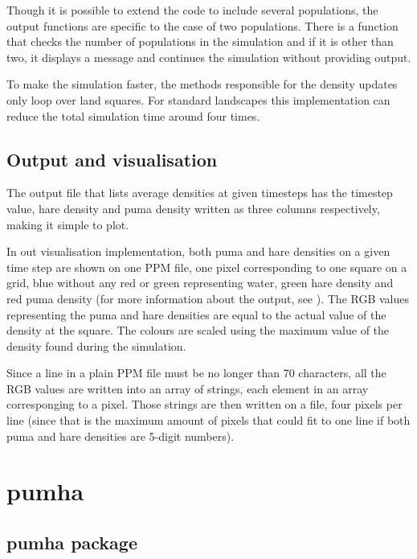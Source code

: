\documentclass[letterpaper,10pt,english]{sphinxmanual}
\begin{document}
Though it is possible to extend the code to include several populations, the output functions are specific to the case of two populations. There is a function that checks the number of populations in the simulation and if it is other than two, it displays a message and continues the simulation without providing output.

To make the simulation faster, the methods responsible for the density updates only loop over land squares. For standard landscapes this implementation can reduce the total simulation time around four times.


\section{Output and visualisation}
\label{\detokenize{index:output-and-visualisation}}
The output file that lists average densities at given timesteps has the timestep value, hare density and puma density written as three columns respectively, making it simple to plot.

In out visualisation implementation, both puma and hare densities on a given time step are shown on one PPM file, one pixel corresponding to one square on a grid, blue without any red or green representing water, green hare density and red puma density (for more information about the output, see {\hyperref[\detokenize{index:how-to-use}]{}}). The RGB values representing the puma and hare densities are equal to the actual value of the density at the square. The colours are scaled using the maximum value of the density found during the simulation.

Since a line in a plain PPM file must be no longer than 70 characters, all the RGB values are written into an array of strings, each element in an array corresponging to a pixel. Those strings are then written on a file, four pixels per line (since that is the maximum amount of pixels that could fit to one line if both puma and hare densities are 5-digit numbers).


\chapter{pumha}
\label{\detokenize{index:pumha}}

\section{pumha package}
\label{\detokenize{pumha:pumha-package}}\label{\detokenize{pumha::doc}}
\end{document}
